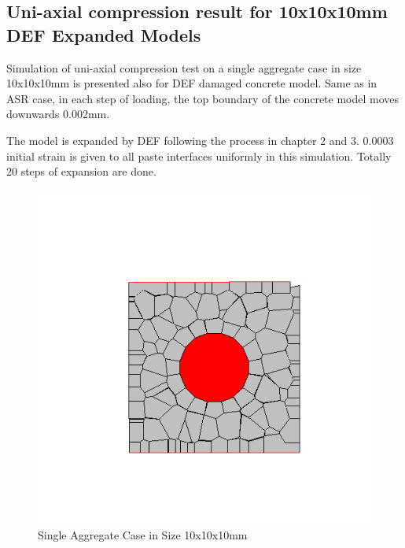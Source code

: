 \subsection{Uni-axial compression result for 10x10x10mm DEF Expanded Models}

Simulation of uni-axial compression test on a single aggregate case in size 10x10x10mm is presented also for DEF damaged concrete model. Same as in ASR case, in each step of loading, the top boundary of the concrete model moves downwards 0.002mm.

The model is expanded by DEF following the process in chapter 2 and 3. 0.0003 initial strain is given to all paste interfaces uniformly in this simulation. Totally 20 steps of expansion are done.


\begin{figure}[h!]
\centering
\includegraphics[width=0.4\linewidth]{Files/Small_DEF/CR/DEP5-STEP(001).png}
\caption{Single Aggregate Case in Size 10x10x10mm}
\end{figure}

